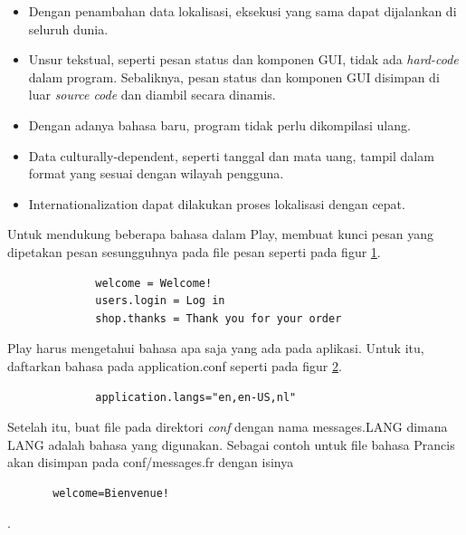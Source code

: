 \begin{itemize}
	\item Dengan penambahan data lokalisasi, eksekusi yang sama dapat dijalankan di seluruh dunia.
	\item Unsur tekstual, seperti pesan status dan komponen GUI, tidak ada \textit{hard-code} dalam program. Sebaliknya, pesan status dan komponen GUI disimpan di luar \textit{source code} dan diambil secara dinamis.
	\item Dengan adanya bahasa baru, program tidak perlu dikompilasi ulang.
	\item Data culturally-dependent, seperti tanggal dan mata uang, tampil dalam format yang sesuai dengan wilayah pengguna.
	\item Internationalization dapat dilakukan proses lokalisasi dengan cepat.
\end{itemize}

Untuk mendukung beberapa bahasa dalam Play, membuat kunci pesan yang dipetakan pesan sesungguhnya pada file pesan seperti pada figur \ref{fig:2_play_i18n}.

\begin{figure}[H]
	\centering
	
	\begin{lstlisting}
		welcome = Welcome!
		users.login = Log in
		shop.thanks = Thank you for your order
	\end{lstlisting}

	\label{fig:2_play_i18n}
\end{figure}

Play harus mengetahui bahasa apa saja yang ada pada aplikasi. Untuk itu, daftarkan bahasa pada application.conf seperti pada figur \ref{fig:2_play_i18n_conf}.

\begin{figure}[H]
	\centering
	
	\begin{lstlisting}
		application.langs="en,en-US,nl"
	\end{lstlisting}

	\label{fig:2_play_i18n_conf}
\end{figure}

Setelah itu, buat file pada direktori \textit{conf} dengan nama messages.LANG dimana LANG adalah bahasa yang digunakan. Sebagai contoh untuk file bahasa Prancis akan disimpan pada conf/messages.fr dengan isinya \begin{lstlisting}		welcome=Bienvenue!
	\end{lstlisting}.
	

